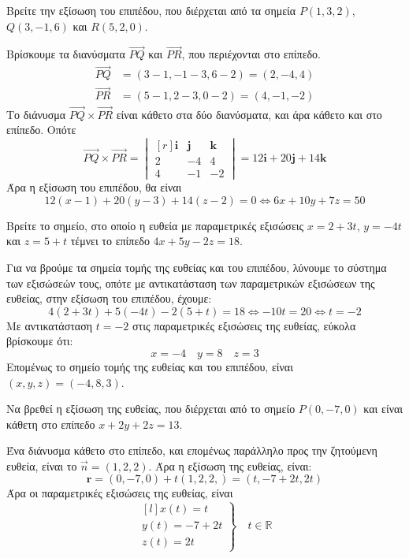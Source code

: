 \begin{example}
  Βρείτε την εξίσωση του επιπέδου, που διέρχεται από τα σημεία 
  $ P(1,3,2) $, $ Q(3,-1,6) $ και $R(5,2,0) $.
\end{example}
\begin{solution}
  Βρίσκουμε τα διανύσματα $ \vec{PQ} $ και $ \vec{PR} $, που περιέχονται στο επίπεδο.
  \begin{align*}
    \vec{PQ} &= (3-1,-1-3,6-2) = (2,-4,4) \\
    \vec{PR} &= (5-1,2-3,0-2) = (4,-1,-2)
  \end{align*} 
  Το διάνυσμα $ \vec{PQ} \times \vec{PR} $ είναι κάθετο στα δύο διανύσματα, και άρα 
  κάθετο και στο επίπεδο. Οπότε
  \[
    \vec{PQ} \times \vec{PR} = 
    \begin{vmatrix*}[r]
      \mathbf{i} & \mathbf{j} & \mathbf{k} \\
      2 & -4 & 4 \\
      4 & -1 & -2
    \end{vmatrix*} = 12 \mathbf{i} + 20 \mathbf{j} + 14 \mathbf{k}
  \] 
  Άρα η εξίσωση του επιπέδου, θα είναι 
  \[
    12(x-1) + 20(y-3) + 14(z-2) = 0 \Leftrightarrow 6x+10y+7z=50
  \]
\end{solution}


\begin{example}
  Βρείτε το σημείο, στο οποίο η ευθεία με παραμετρικές εξισώσεις $ x=2+3t $, $ y=-4t
  $ και $ z=5+t $ τέμνει το επίπεδο $ 4x+5y-2z=18 $.
\end{example}
\begin{solution}
  Για να βρούμε τα σημεία τομής της ευθείας και του επιπέδου, λύνουμε το σύστημα των 
  εξισώσεών τους, οπότε με αντικατάσταση των παραμετρικών εξισώσεων της ευθείας, 
  στην εξίσωση του επιπέδου, έχουμε:
  \[
    4(2+3t) + 5(-4t) -2(5+t) = 18 \Leftrightarrow -10t=20 \Leftrightarrow t=-2 
  \] 
  Με αντικατάσταση $ t=-2 $ στις παραμετρικές εξισώσεις της ευθείας, εύκολα 
  βρίσκουμε ότι:
  \[
    x=-4 \quad y=8 \quad z=3
  \] 
  Επομένως το σημείο τομής της ευθείας και του επιπέδου, είναι $ (x,y,z) = (-4,8,3) $.
\end{solution}

\begin{example}
  Να βρεθεί η εξίσωση της ευθείας, που διέρχεται από το σημείο $ P(0,-7,0) $ 
  και είναι κάθετη στο επίπεδο $ x+2y+2z=13 $.
\end{example}
\begin{solution}
  Ένα διάνυσμα κάθετο στο επίπεδο, και επομένως παράλληλο προς την ζητούμενη ευθεία, 
  είναι το $ \vec{n} = (1,2,2) $. Άρα η εξίσωση της ευθείας, είναι:
  \[
    \mathbf{r} = (0,-7,0) + t(1,2,2,) = (t, -7+2t, 2t) 
  \]
  Άρα οι παραμετρικές εξισώσεις της ευθείας, είναι 
  \[
    \left. 
      \begin{matrix*}[l]
        x(t)=t \\
        y(t)=-7+2t \\
        z(t)=2t
      \end{matrix*} 
    \right\} \quad t \in \mathbb{R}
  \] 
\end{solution}

